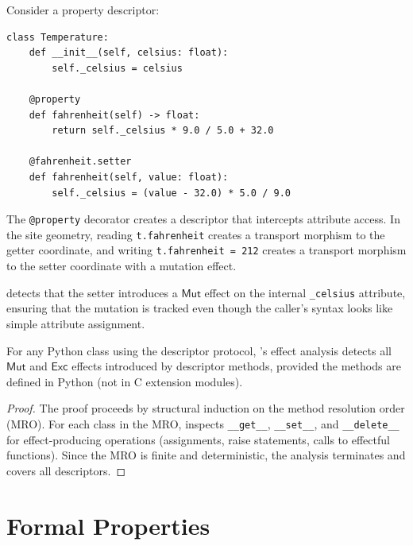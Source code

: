 \documentclass[11pt]{article}
\newcommand{\Exc}{\mathsf{Exc}}          %
\newcommand{\Mut}{\mathsf{Mut}}          %
\begin{document}
Consider a property descriptor:

\begin{lstlisting}[style=jugeo-python,caption={Property descriptor with hidden effects.}]
class Temperature:
    def __init__(self, celsius: float):
        self._celsius = celsius

    @property
    def fahrenheit(self) -> float:
        return self._celsius * 9.0 / 5.0 + 32.0

    @fahrenheit.setter
    def fahrenheit(self, value: float):
        self._celsius = (value - 32.0) * 5.0 / 9.0
\end{lstlisting}

The \texttt{@property} decorator creates a descriptor that intercepts
attribute access.  In the site geometry, reading \texttt{t.fahrenheit}
creates a transport morphism to the getter coordinate, and writing
\texttt{t.fahrenheit = 212} creates a transport morphism to the setter
coordinate with a mutation effect.

\JuGeo{} detects that the setter introduces a $\Mut$ effect on the
internal \texttt{\_celsius} attribute, ensuring that the mutation is
tracked even though the caller's syntax looks like simple attribute
assignment.

\begin{theorem}\label{thm:mop}
For any Python class using the descriptor protocol, \JuGeo{}'s
effect analysis detects all $\Mut$ and $\Exc$ effects introduced
by descriptor methods, provided the methods are defined in Python
(not in C extension modules).
\end{theorem}

\begin{proof}
The proof proceeds by structural induction on the method resolution
order (MRO).  For each class in the MRO, \JuGeo{} inspects
\texttt{\_\_get\_\_}, \texttt{\_\_set\_\_}, and
\texttt{\_\_delete\_\_} for effect-producing operations (assignments,
raise statements, calls to effectful functions).  Since the MRO is
finite and deterministic, the analysis terminates and covers all
descriptors.
\end{proof}

\section{Formal Properties}\label{sec:formal}
\end{document}
